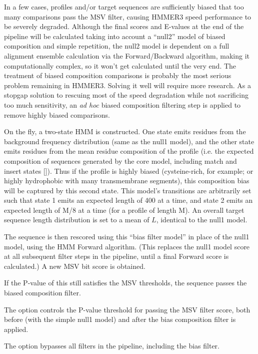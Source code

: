 In a few cases, profiles and/or target sequences are sufficiently
biased that too many comparisons pass the MSV filter, causing HMMER3
speed performance to be severely degraded. Although the final scores
and E-values at the end of the pipeline will be calculated taking into
account a ``null2'' model of biased composition and simple repetition,
the null2 model is dependent on a full alignment ensemble calculation
via the Forward/Backward algorithm, making it computationally complex,
so it won't get calculated until the very end. The treatment of biased
composition comparisons is probably the most serious problem remaining
in HMMER3. Solving it well will require more research. As a stopgap
solution to rescuing most of the speed degradation while not
sacrificing too much sensitivity, an \emph{ad hoc} biased composition
filtering step is applied to remove highly biased comparisons.

On the fly, a two-state HMM is constructed. One state emits residues
from the background frequency distribution (same as the null1 model),
and the other state emits residues from the mean residue composition
of the profile (i.e. the expected composition of sequences generated
by the core model, including match and insert states
[]). Thus if the profile is
highly biased (cysteine-rich, for example; or highly hydrophobic with
many transmembrane segments), this composition bias will be captured
by this second state. This model's transitions are arbitrarily set
such that state 1 emits an expected length of 400 at a time, and state
2 emits an expected length of M/8 at a time (for a profile of length
M). An overall target sequence length distribution is set to a mean of
$L$, identical to the null1 model.

The sequence is then rescored using this ``bias filter model'' in
place of the null1 model, using the HMM Forward algorithm. (This
replaces the null1 model score at all subsequent filter steps in the
pipeline, until a final Forward score is calculated.) A new MSV bit
score is obtained.

If the P-value of this still satisfies the MSV thresholds, the
sequence passes the biased composition filter. 

The  option controls the P-value threshold for
passing the MSV filter score, both before (with the simple null1
model) and after the bias composition filter is applied.

The  option bypasses all filters in the pipeline,
including the bias filter.

